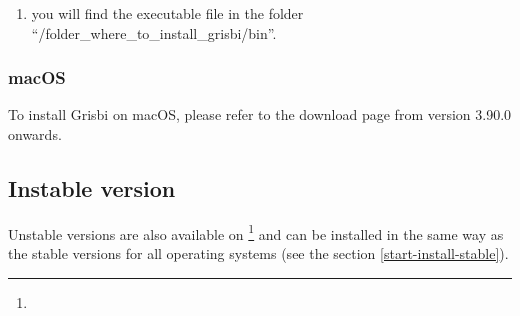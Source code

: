 \setlength{\parindent}{20pt}
\par
\par
\vspace{1mm}

\begin{enumerate}[resume]
	\item you will find the executable file in the folder \enquote{/folder\_where\_to\_install\_grisbi/bin}.
\end{enumerate}


\subsubsection{macOS\label{start-install-stable-macos}}

To install Grisbi on macOS, please refer to the download page from version 3.90.0 onwards.%


\subsection{Instable version\label{start-install-instable}}

Unstable versions are also available on \footnote{\urlSourceForgeGrisbiInstable} and can be installed in the same way as the stable versions for all operating systems (see the section \vref{start-install-stable}).


